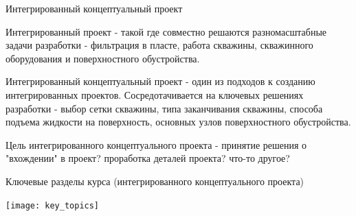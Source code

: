 \begin{frame}{Интегрированный концептуальный проект}

Интегрированный проект - такой где совместно решаются разномасштабные задачи разработки - фильтрация в пласте, работа скважины, скважинного оборудования и поверхностного обустройства.

Интегрированный концептуальный проект - один из подходов к созданию интегрированных проектов. Сосредотачивается на ключевых решениях разработки - выбор сетки скважины, типа заканчивания скважины, способа подъема жидкости на поверхность, основных узлов поверхностного обустройства.

Цель интегрированного концептуального проекта - принятие решения о "вхождении" в проект? проработка деталей проекта? что-то другое?


\end{frame}




\begin{frame}{Ключевые разделы курса (интегрированного концептуального проекта)}

\begin{center}
    \texttt{[image: key\_topics]}
\end{center}

    
\end{frame}




